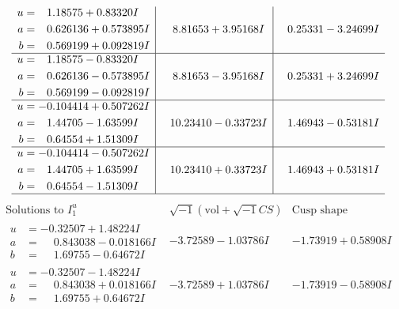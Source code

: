 \documentclass[1p]{elsarticle_modified}
\theoremstyle{definition}
\newcommand{\I}{\sqrt{-1}}
\begin{document}
$$\begin{array}{c|c|c}
\begin{aligned}
u &= \phantom{-}1.18575 + 0.83320 I \\
a &= \phantom{-}0.626136 + 0.573895 I \\
b &= \phantom{-}0.569199 + 0.092819 I\end{aligned}
 & \phantom{-}8.81653 + 3.95168 I & \phantom{-}0.25331 - 3.24699 I \\ \hline\begin{aligned}
u &= \phantom{-}1.18575 - 0.83320 I \\
a &= \phantom{-}0.626136 - 0.573895 I \\
b &= \phantom{-}0.569199 - 0.092819 I\end{aligned}
 & \phantom{-}8.81653 - 3.95168 I & \phantom{-}0.25331 + 3.24699 I \\ \hline\begin{aligned}
u &= -0.104414 + 0.507262 I \\
a &= \phantom{-}1.44705 - 1.63599 I \\
b &= \phantom{-}0.64554 + 1.51309 I\end{aligned}
 & \phantom{-}10.23410 - 0.33723 I & \phantom{-}1.46943 - 0.53181 I \\ \hline\begin{aligned}
u &= -0.104414 - 0.507262 I \\
a &= \phantom{-}1.44705 + 1.63599 I \\
b &= \phantom{-}0.64554 - 1.51309 I\end{aligned}
 & \phantom{-}10.23410 + 0.33723 I & \phantom{-}1.46943 + 0.53181 I\\
 \hline 
 \end{array}$$\newpage$$\begin{array}{c|c|c}  
\text{Solutions to }I^u_{1}& \I (\text{vol} + \sqrt{-1}CS) & \text{Cusp shape}\\
 \hline 
\begin{aligned}
u &= -0.32507 + 1.48224 I \\
a &= \phantom{-}0.843038 - 0.018166 I \\
b &= \phantom{-}1.69755 - 0.64672 I\end{aligned}
 & -3.72589 - 1.03786 I & -1.73919 + 0.58908 I \\ \hline\begin{aligned}
u &= -0.32507 - 1.48224 I \\
a &= \phantom{-}0.843038 + 0.018166 I \\
b &= \phantom{-}1.69755 + 0.64672 I\end{aligned}
 & -3.72589 + 1.03786 I & -1.73919 - 0.58908 I \\ \hline\begin{aligned}

\end{aligned}
\end{array}$$
\end{document}
